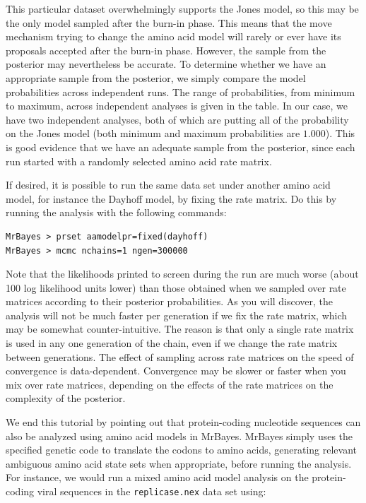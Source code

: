 \documentclass[12pt]{book}
\newcommand{\ttt}[1]{\texttt{#1}}
\begin{document}
This particular dataset overwhelmingly supports the Jones model, so this may be the only model
sampled after the burn-in phase. This means that the move mechanism trying to change the amino acid
model will rarely or ever have its proposals accepted after the burn-in phase. However, the sample
from the posterior may nevertheless be accurate. To determine whether we have an appropriate sample
from the posterior, we simply compare the model probabilities across independent runs. The range of
probabilities, from minimum to maximum, across independent analyses is given in the table. In our
case, we have two independent analyses, both of which are putting all of the probability on the
Jones model (both minimum and maximum probabilities are $1.000$). This is good evidence that we
have an adequate sample from the posterior, since each run started with a randomly selected amino
acid rate matrix.

If desired, it is possible to run the same data set under another amino acid model, for instance
the Dayhoff model, by fixing the rate matrix. Do this by running the analysis with the following
commands:

\begin{singlespacing}
\small
\begin{verbatim}
MrBayes > prset aamodelpr=fixed(dayhoff)
MrBayes > mcmc nchains=1 ngen=300000
\end{verbatim}
\normalsize
\end{singlespacing}

Note that the likelihoods printed to screen during the run are much worse (about 100 log likelihood
units lower) than those obtained when we sampled over rate matrices according to their posterior
probabilities. As you will discover, the analysis will not be much faster per generation if we fix
the rate matrix, which may be somewhat counter-intuitive. The reason is that only a single rate
matrix is used in any one generation of the chain, even if we change the rate matrix between
generations. The effect of sampling across rate matrices on the speed of convergence is
data-dependent. Convergence may be slower or faster when you mix over rate matrices, depending on
the effects of the rate matrices on the complexity of the posterior.

We end this tutorial by pointing out that protein-coding nucleotide sequences can also be analyzed
using amino acid models in MrBayes. MrBayes simply uses the specified genetic code to translate the
codons to amino acids, generating relevant ambiguous amino acid state sets when appropriate, before
running the analysis. For instance, we would run a mixed amino acid model analysis on the
protein-coding viral sequences in the \ttt{replicase.nex} data set using:
\end{document}
